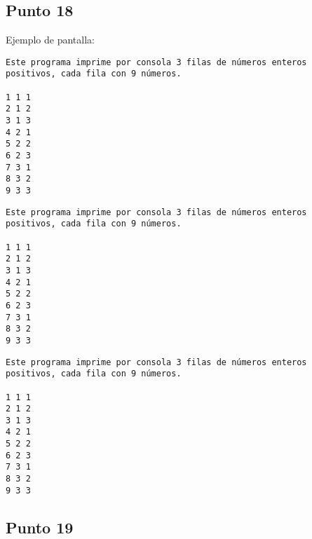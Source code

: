 


\subsection{Punto 18}
	
	Ejemplo de pantalla:
\begin{lstlisting}
Este programa imprime por consola 3 filas de números enteros positivos, cada fila con 9 números.

1 1 1
2 1 2
3 1 3
4 2 1
5 2 2
6 2 3
7 3 1
8 3 2
9 3 3
\end{lstlisting}

\begin{lstlisting}
Este programa imprime por consola 3 filas de números enteros positivos, cada fila con 9 números.

1 1 1
2 1 2
3 1 3
4 2 1
5 2 2
6 2 3
7 3 1
8 3 2
9 3 3
\end{lstlisting}

\begin{lstlisting}
Este programa imprime por consola 3 filas de números enteros positivos, cada fila con 9 números.

1 1 1
2 1 2
3 1 3
4 2 1
5 2 2
6 2 3
7 3 1
8 3 2
9 3 3
\end{lstlisting}





\subsection{Punto 19}
	
